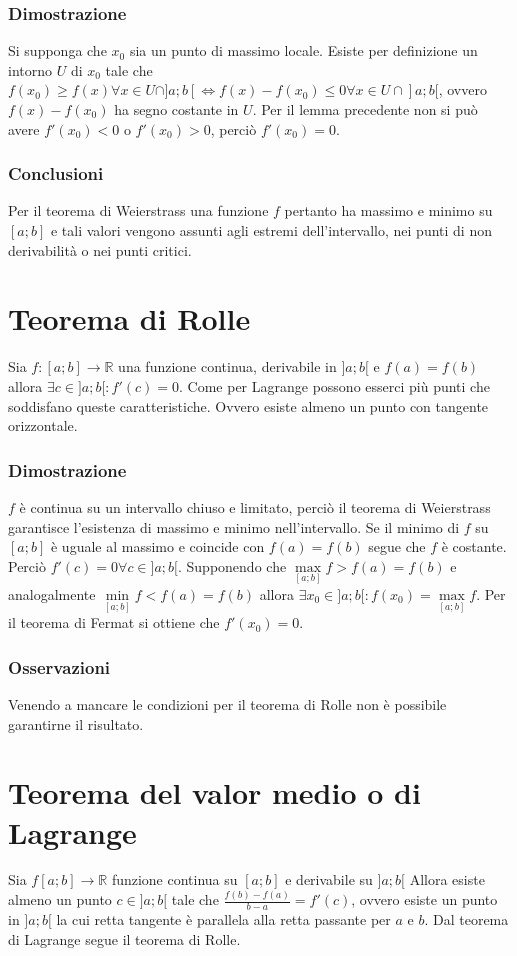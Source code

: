 \subsubsection{Dimostrazione}
Si supponga che $x_0$ sia un punto di massimo locale. Esiste per definizione un intorno $U$ di $x_0$ tale che $f(x_0)\ge f(x)\forall x\in U\cap]a;b[\Leftrightarrow 
f(x)-f(x_0)\le 0\forall x\in U\cap]a;b[$, ovvero $f(x)-f(x_0)$ ha segno costante in $U$. Per il lemma precedente non si pu\`o avere $f'(x_0)<0$ o $f'(x_0)>0$, perci\`o 
$f'(x_0)=0$.
\subsubsection{Conclusioni}
Per il teorema di Weierstrass una funzione $f$ pertanto ha massimo e minimo su $[a;b]$ e tali valori vengono assunti agli estremi dell'intervallo, nei punti di non 
derivabilit\`a o nei punti critici.
\section{Teorema di Rolle}
Sia $f:[a;b]\rightarrow\mathbb{R}$ una funzione continua, derivabile in $]a;b[$ e $f(a)=f(b)$ allora $\exists c\in]a;b[:f'(c)=0$. Come per Lagrange possono esserci pi\`u 
punti che soddisfano queste caratteristiche. Ovvero esiste almeno un punto con tangente orizzontale. 
\subsubsection{Dimostrazione}
$f$ \`e continua su un intervallo chiuso e limitato, perci\`o il teorema di Weierstrass garantisce l'esistenza di massimo e minimo nell'intervallo. Se il minimo di $f$ su 
$[a;b]$ \`e uguale al massimo e coincide con $f(a)=f(b)$ segue che $f$ \`e costante. Perci\`o $f'(c)=0\forall c\in]a;b[$. Supponendo che $\max\limits_{[a;b]} f>f(a)=f(b)$ e 
analogalmente $\min\limits_{[a;b]} f<f(a)=f(b)$ allora $\exists x_0\in ]a;b[:f(x_0)=\max\limits_{[a;b]} f$. Per il teorema di Fermat si ottiene che $f'(x_0)=0$.
\subsubsection{Osservazioni}
Venendo a mancare le condizioni per il teorema di Rolle non \`e possibile garantirne il risultato.
\section{Teorema del valor medio o di Lagrange}
Sia $f[a;b]\rightarrow\mathbb{R}$ funzione continua su $[a;b]$ e derivabile su $]a;b[$ Allora esiste almeno un punto $c\in]a;b[$ tale che $\frac{f(b)-f(a)}{b-a}=f'(c)$, 
ovvero esiste un punto in $]a;b[$ la cui retta tangente \`e parallela alla retta passante per $a$ e $b$. Dal teorema di Lagrange segue il teorema di Rolle.
